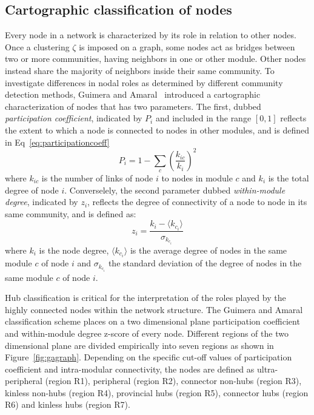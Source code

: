 \subsection{Cartographic classification of nodes}
Every node in a network is characterized by its role in relation to other nodes.
Once a clustering $\zeta$ is imposed on a graph, some nodes act as bridges between two or more communities, having neighbors in one or other module.
Other nodes instead share the majority of neighbors inside their same community.
To investigate differences in nodal roles as determined by different community detection methods, Guimera and Amaral~\cite{guimera2005} introduced a cartographic characterization of nodes that has two parameters.
The first, dubbed \emph{participation coefficient}, indicated by $P_i$ and included in the range $[0,1]$ reflects the extent to which a node is connected to nodes in other modules, and is defined in Eq~\ref{eq:participationcoeff} 
\begin{equation}\label{eq:participationcoeff}
P_i = 1 - \sum_c \left( \frac{k_{ic}}{k_i} \right)^2
\end{equation}
where $k_{ic}$ is the number of links of node $i$ to nodes in module $c$ and $k_i$ is the total degree of node $i$.
Converselely, the second parameter dubbed \emph{within-module degree}, indicated by $z_i$,  reflects the degree of connectivity of a node to node in its same community, and is defined as: 
\begin{equation}\label{eq:withinmoduledegree}
z_i = \frac{k_i - \langle  k_{c_i} \rangle }{\sigma_{k_{c_i}}}
\end{equation}
where $k_i$ is the node degree,  $\langle  k_{c_i} \rangle $ is the average degree of nodes in the same module $c$ of node $i$ and $\sigma_{k_{c_i}}$ the standard deviation of the degree of nodes in the same module $c$ of node $i$.

Hub classification is critical for the interpretation of the roles played by the highly connected nodes within the network structure.
The Guimera and Amaral~\cite{guimera2005} classification scheme places on a two dimensional plane participation coefficient and within-module degree z-score of every node. Different regions of the two dimensional plane are divided empirically into seven regions as shown in Figure~\ref{fig:gagraph}.
Depending on the specific cut-off values of participation coefficient and intra-modular connectivity, the nodes are defined as ultra-peripheral (region R1), peripheral (region R2), connector non-hubs (region R3), kinless non-hubs (region R4), provincial hubs (region R5), connector hubs (region R6) and kinless hubs (region R7).

